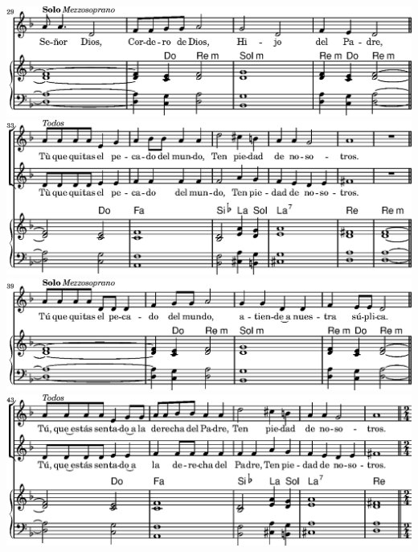  \linebreak
\else
  \expandafter{}%
\fi
\includegraphics{99/lily-924018f8-11}%
\ifx\betweenLilyPondSystem \undefined
  \linebreak
\else
  \expandafter{}%
\fi
\includegraphics{99/lily-924018f8-12}%
\ifx\betweenLilyPondSystem \undefined
  \linebreak
\else
  \expandafter{}%
\fi
\includegraphics{99/lily-924018f8-13}%
\ifx\betweenLilyPondSystem \undefined
  \linebreak
\else
  \expandafter{}%
\fi
\includegraphics{99/lily-924018f8-14}%
\ifx\betweenLilyPondSystem \undefined
  \linebreak
\else
  \expandafter{}%
